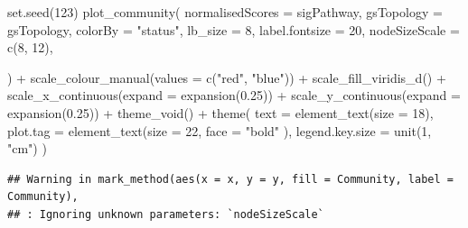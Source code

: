\documentclass[9pt,a4paper,]{extarticle}
\newenvironment{Shaded}{\begin{snugshade}}{\end{snugshade}}
\newcommand{\AttributeTok}[1]{\textcolor[rgb]{0.77,0.63,0.00}{#1}}
\newcommand{\DecValTok}[1]{\textcolor[rgb]{0.00,0.00,0.81}{#1}}
\newcommand{\FloatTok}[1]{\textcolor[rgb]{0.00,0.00,0.81}{#1}}
\newcommand{\FunctionTok}[1]{\textcolor[rgb]{0.00,0.00,0.00}{#1}}
\newcommand{\NormalTok}[1]{#1}
\newcommand{\SpecialCharTok}[1]{\textcolor[rgb]{0.00,0.00,0.00}{#1}}
\newcommand{\StringTok}[1]{\textcolor[rgb]{0.31,0.60,0.02}{#1}}
\begin{document}
\begin{Shaded}
\begin{Highlighting}[]
\FunctionTok{set.seed}\NormalTok{(}\DecValTok{123}\NormalTok{)}
\FunctionTok{plot\_community}\NormalTok{(}
    \AttributeTok{normalisedScores =}\NormalTok{ sigPathway,}
    \AttributeTok{gsTopology =}\NormalTok{ gsTopology, }
    \AttributeTok{colorBy =} \StringTok{"status"}\NormalTok{, }
    \AttributeTok{lb\_size =} \DecValTok{8}\NormalTok{, }
    \AttributeTok{label.fontsize =} \DecValTok{20}\NormalTok{,}
    \AttributeTok{nodeSizeScale =} \FunctionTok{c}\NormalTok{(}\DecValTok{8}\NormalTok{, }\DecValTok{12}\NormalTok{), }
    
\NormalTok{) }\SpecialCharTok{+}
    \FunctionTok{scale\_colour\_manual}\NormalTok{(}\AttributeTok{values =} \FunctionTok{c}\NormalTok{(}\StringTok{"red"}\NormalTok{, }\StringTok{"blue"}\NormalTok{)) }\SpecialCharTok{+}
    \FunctionTok{scale\_fill\_viridis\_d}\NormalTok{() }\SpecialCharTok{+}
    \FunctionTok{scale\_x\_continuous}\NormalTok{(}\AttributeTok{expand =} \FunctionTok{expansion}\NormalTok{(}\FloatTok{0.25}\NormalTok{)) }\SpecialCharTok{+}
    \FunctionTok{scale\_y\_continuous}\NormalTok{(}\AttributeTok{expand =} \FunctionTok{expansion}\NormalTok{(}\FloatTok{0.25}\NormalTok{)) }\SpecialCharTok{+}
    \FunctionTok{theme\_void}\NormalTok{() }\SpecialCharTok{+}
    \FunctionTok{theme}\NormalTok{(}
        \AttributeTok{text =} \FunctionTok{element\_text}\NormalTok{(}\AttributeTok{size =} \DecValTok{18}\NormalTok{),}
        \AttributeTok{plot.tag =} \FunctionTok{element\_text}\NormalTok{(}\AttributeTok{size =} \DecValTok{22}\NormalTok{, }\AttributeTok{face =} \StringTok{"bold"}\NormalTok{ ), }
        \AttributeTok{legend.key.size =} \FunctionTok{unit}\NormalTok{(}\DecValTok{1}\NormalTok{, }\StringTok{"cm"}\NormalTok{)}
\NormalTok{    )}
\end{Highlighting}
\end{Shaded}

\begin{verbatim}
## Warning in mark_method(aes(x = x, y = y, fill = Community, label = Community),
## : Ignoring unknown parameters: `nodeSizeScale`
\end{verbatim}
\end{document}

